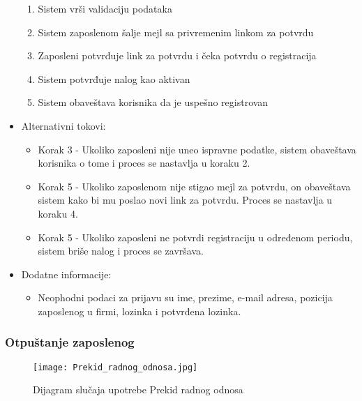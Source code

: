 \documentclass[a4paper]{article}
\begin{document}
\begin{itemize}
\begin{enumerate}
            \item Sistem vrši validaciju podataka 
            \item Sistem zaposlenom šalje mejl sa privremenim linkom za potvrdu
            \item Zaposleni potvrđuje link za potvrdu i čeka potvrdu o registracija
            \item Sistem potvrđuje nalog kao aktivan
            \item Sistem obaveštava korisnika da je uspešno registrovan 
        \end{enumerate}
    \item Alternativni tokovi:
        \begin{itemize}
            \item Korak 3 - Ukoliko zaposleni nije uneo ispravne podatke, sistem obaveštava korisnika o tome i proces se nastavlja u koraku 2.
            \item Korak 5 - Ukoliko zaposlenom nije stigao mejl za potvrdu, on obaveštava sistem kako bi mu poslao novi link za potvrdu. Proces se nastavlja u koraku 4.
            \item Korak 5 - Ukoliko zaposleni ne potvrdi registraciju u određenom periodu, sistem briše nalog i proces se završava.
        \end{itemize}
    \item Dodatne informacije:
        \begin{itemize}
            \item Neophodni podaci za prijavu su ime, prezime, e-mail adresa, pozicija zaposlenog u firmi, lozinka i potvrđena lozinka.
        \end{itemize}
\end{itemize}

\subsubsection{Otpuštanje zaposlenog}

\begin{figure}[htp]
    \centering
    \texttt{[image: Prekid\_radnog\_odnosa.jpg]}
    \caption{Dijagram slučaja upotrebe Prekid radnog odnosa}
    \label{fig:Prekid}
\end{figure}
\end{document}
